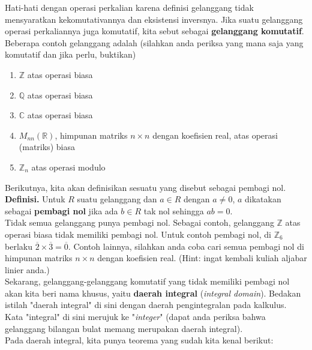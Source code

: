 	Hati-hati dengan operasi perkalian karena definisi gelanggang tidak mensyaratkan kekomutativannya dan eksistensi inversnya. Jika suatu gelanggang operasi perkaliannya juga komutatif, kita sebut sebagai \textbf{gelanggang komutatif}. Beberapa contoh gelanggang adalah (silahkan anda periksa yang mana saja yang komutatif dan jika perlu, buktikan) \begin{enumerate}
		\item $\mathbb{Z}$ atas operasi biasa
		\item $\mathbb{Q}$ atas operasi biasa
		\item $\mathbb{C}$ atas operasi biasa
		\item $M_{nn}(\mathbb{R})$, himpunan matriks $n \times n$ dengan koefisien real, atas operasi (matriks) biasa
		\item $\mathbb{Z}_n$ atas operasi modulo
	\end{enumerate}
	
	Berikutnya, kita akan definisikan sesuatu yang disebut sebagai pembagi nol.\\
	
	\textbf{Definisi. }Untuk $R$ suatu gelanggang dan $a \in R$ dengan $a \ne 0$, $a$ dikatakan sebagai \textbf{pembagi nol} jika ada $b \in R$ tak nol sehingga $ab = 0$.
	\\
	
	Tidak semua gelanggang punya pembagi nol. Sebagai contoh, gelanggang $\mathbb{Z}$ atas operasi biasa tidak memiliki pembagi nol. Untuk contoh pembagi nol, di $\mathbb{Z}_6$ berlaku $\overline{2}\times \overline{3} = \overline{0}$. Contoh lainnya, silahkan anda coba cari semua pembagi nol di himpunan matriks $n\times n$ dengan koefisien real. (Hint: ingat kembali kuliah aljabar linier anda.)
	\\
	
	Sekarang, gelanggang-gelanggang komutatif yang tidak memiliki pembagi nol akan kita beri nama khusus, yaitu \textbf{daerah integral} (\textit{integral domain}). Bedakan istilah "daerah integral" di sini dengan daerah pengintegralan pada kalkulus. Kata "integral" di sini merujuk ke "\textit{integer}" (dapat anda periksa bahwa gelanggang bilangan bulat memang merupakan daerah integral).
	\\
	
	Pada daerah integral, kita punya teorema yang sudah kita kenal berikut:
	
